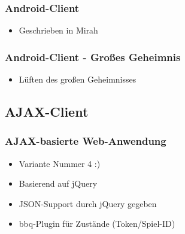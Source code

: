 \documentclass{beamer}
\begin{document}
\begin{frame}[fragile]
\frametitle{Android-Client}
\begin{itemize}
\item Geschrieben in Mirah
\end{itemize}
\end{frame}

\begin{frame}[fragile]
\frametitle{Android-Client - Großes Geheimnis}
\begin{itemize}
\item Lüften des großen Geheimnisses
\end{itemize}
\end{frame}

\subsection{AJAX-Client}

\begin{frame}[fragile]
\frametitle{AJAX-basierte Web-Anwendung}
\begin{itemize}
\item Variante Nummer 4 :)
\item Basierend auf jQuery
\item JSON-Support durch jQuery gegeben
\item bbq-Plugin für Zustände (Token/Spiel-ID)
\end{itemize}
\end{frame}
\end{document}
